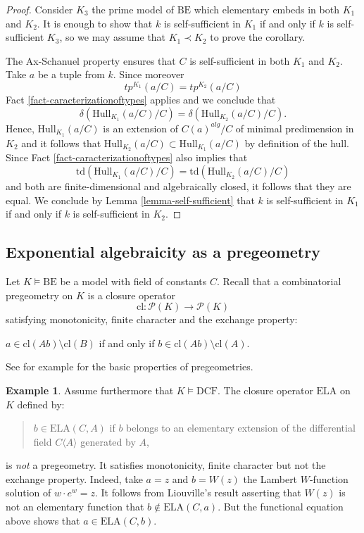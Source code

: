 \documentclass[12pt]{amsart}
\newcommand{\DCF}{\mathrm{DCF}}
\newcommand{\BE}{\mathrm{BE}}
\theoremstyle{definition}
\newtheorem{exam}[defn]{Example}
\theoremstyle{plain}
\theoremstyle{exampstyle}\newtheorem{thmx}{Theorem}
\theoremstyle{exampstyle}\newtheorem{thmxbis}{Theorem}
\begin{document}
\begin{proof} 
Consider $K_3$ the prime model of $\BE$ which elementary embeds in both $K_1$ and $K_2$. It is enough to show that $k$ is self-sufficient in $K_1$ if and only if $k$ is self-sufficient $K_3$, so we may assume that $K_1 \prec K_2$ to prove the corollary.


The Ax-Schanuel property ensures that $C$ is self-sufficient in both $K_1$ and $K_2$. Take $a$ be a tuple from $k$. Since moreover
$$tp^{K_1}(a/C) = tp^{K_2}(a/C)$$
Fact \ref{fact-caracterizationoftypes} applies and we conclude that
$$ \delta(\mathrm{Hull}_{K_1}(a/C)/C) =  \delta(\mathrm{Hull}_{K_2}(a/C)/C).$$
Hence, $\mathrm{Hull}_{K_1}(a/C)$ is an extension of $C(a)^{alg}/C$ of minimal predimension in $K_2$ and it follows that $\mathrm{Hull}_{K_2}(a/C) \subset \mathrm{Hull}_{K_1}(a/C)$ by definition of the hull. Since Fact \ref{fact-caracterizationoftypes} also implies that 
$$\mathrm{td}(\mathrm{Hull}_{K_1}(a/C)/C) =  \mathrm{td}(\mathrm{Hull}_{K_2}(a/C)/C) $$
and both are finite-dimensional and algebraically closed, it follows that they are equal. We conclude by Lemma \ref{lemma-self-sufficient} that $k$ is self-sufficient in $K_1$ if and only if $k$ is self-sufficient in $K_2$.
\end{proof} 


\subsection{Exponential algebraicity as a pregeometry} Let $K \models \BE$ be a model with field of constants $C$. Recall that a combinatorial pregeometry on $K$ is a closure operator
$$ \mathrm{cl}: \mathcal P(K) \rightarrow \mathcal P(K) $$
satisfying monotonicity, finite character and the exchange property: 
\begin{center}
$a \in \mathrm{cl}(Ab) \setminus \mathrm{cl}(B)$ if and only if $b \in \mathrm{cl}(Ab) \setminus \mathrm{cl}(A)$. 
\end{center} See for example \cite[Chapter 2, Section 1]{Pillay} for  the basic properties of pregeometries. 

\begin{exam}
Assume furthermore that $K \models \DCF$. The closure operator $\mathrm{ELA}$ on $K$ defined by: 
\begin{quote}
$b \in \mathrm{ELA}(C, A)$ if $b$ belongs to an elementary extension of the differential field $C \langle A \rangle$ generated by $A$,
\end{quote}
is {\em  not} a pregeometry. It satisfies monotonicity, finite character but not the exchange property. Indeed, take $a = z$ and $b = W(z)$ the Lambert $W$-function solution of $w \cdot e^w = z$. It follows from Liouville's result asserting that $W(z)$ is not an elementary function that $b \notin \mathrm{ELA}(C, a)$. But the functional equation above shows that $a \in \mathrm{ELA}(C,b)$.
\end{exam}
\end{document}
